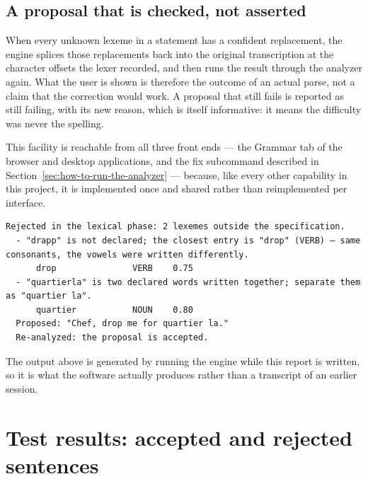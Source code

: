 \documentclass[11pt,a4paper]{article}
\newcommand{\vbfmt}{\color{ink!88}}
\begin{document}
\subsection{A proposal that is checked, not asserted}
When every unknown lexeme in a statement has a confident replacement, the engine splices those replacements back into the original transcription at the character offsets the lexer recorded, and then runs the result through the analyzer again. What the user is shown is therefore the outcome of an actual parse, not a claim that the correction would work. A proposal that still fails is reported as still failing, with its new reason, which is itself informative: it means the difficulty was never the spelling.

This facility is reachable from all three front ends --- the Grammar tab of the browser and desktop applications, and the fix subcommand described in Section~\ref{sec:how-to-run-the-analyzer} --- because, like every other capability in this project, it is implemented once and shared rather than reimplemented per interface.

\begin{Verbatim}[commandchars=\\\{\},fontsize=\small,formatcom=\vbfmt,frame=leftline,framerule=1.2pt,rulecolor=\color{clay!55},framesep=6pt,xleftmargin=10pt,xrightmargin=4pt]
Rejected in the lexical phase: 2 lexemes outside the specification.
  - "drapp" is not declared; the closest entry is "drop" (VERB) — same consonants, the vowels were written differently.
      drop               VERB    0.75
  - "quartierla" is two declared words written together; separate them as "quartier la".
      quartier           NOUN    0.80
  Proposed: "Chef, drop me for quartier la."
  Re-analyzed: the proposal is accepted.
\end{Verbatim}
The output above is generated by running the engine while this report is written, so it is what the software actually produces rather than a transcript of an earlier session.

\section{Test results: accepted and rejected sentences}
\label{sec:test-results-accepted-and-rejected-sentences}
\end{document}
